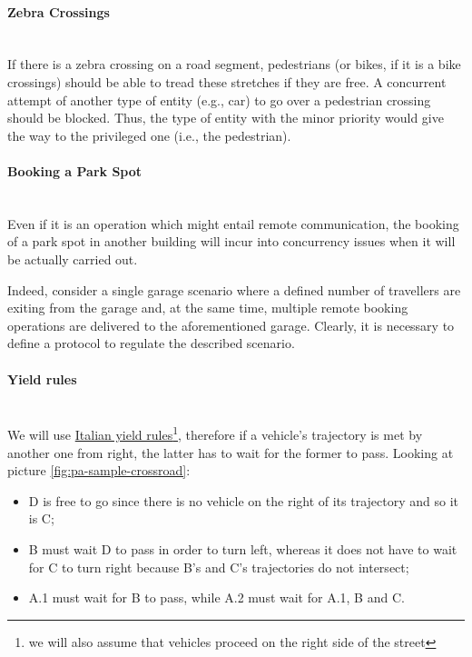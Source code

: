 \paragraph{Zebra Crossings} \mbox{} \\

If there is a zebra crossing on a road segment, pedestrians (or bikes, if it
is a bike crossings) should be able to tread these stretches if they are free.
A concurrent attempt of another type of entity (e.g., car) to go over a
pedestrian crossing should be blocked. Thus, the type of
entity with the minor priority would give the way to the
privileged one (i.e., the pedestrian).

\paragraph{Booking a Park Spot} \mbox{} \\

Even if it is an operation which might entail remote communication, the booking
of a park spot in another building will incur into concurrency issues when it
will be actually carried out.

Indeed, consider a single garage scenario where a defined number of travellers
are exiting from the garage and, at the same time, multiple remote booking
operations are delivered to the aforementioned garage. Clearly,
it is necessary to define a protocol to regulate the described scenario.

\paragraph{Yield rules} \mbox{} \\

We will use \href{http://www.aci.it/i-servizi/normative/codice-della-strada/titolo-v-norme-di-comportamento/art-145-precedenza.html}{Italian yield rules}\footnote{we will also assume that vehicles proceed on the right side of the
street}, therefore if a vehicle's trajectory is met by another one from right,
the latter has to wait for the former to pass.
Looking at picture \ref{fig:pa-sample-crossroad}:
\begin{itemize}
    \item D is free to go since there is no vehicle on the right of its trajectory and so it is C;
    \item B must wait D to pass in order to turn left, whereas it does not have to wait
for C to turn right because B's and C's trajectories do not intersect;
    \item A.1 must wait for B to pass, while A.2 must wait for A.1, B and C.
\end{itemize}

